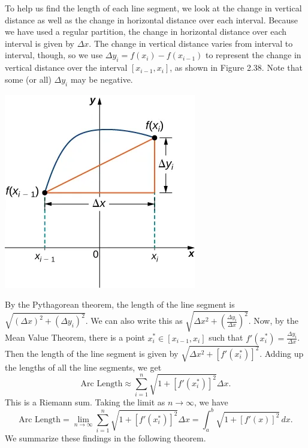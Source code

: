 \documentclass{report}
\begin{document}
    \bigbreak \noindent 
    \begin{minipage}[]{0.47\textwidth}
        To help us find the length of each line segment, we look at the change in vertical distance as well as the change in horizontal distance over each interval. Because we have used a regular partition, the change in horizontal distance over each interval is given by \(\Delta x\). The change in vertical distance varies from interval to interval, though, so we use \(\Delta y_i = f(x_i) - f(x_{i-1})\) to represent the change in vertical distance over the interval \([x_{i-1},x_i]\), as shown in Figure 2.38. Note that some (or all) \(\Delta y_i\) may be negative.
    
    \end{minipage}
    \begin{minipage}[]{0.47\textwidth}
        \begin{center}
            \includegraphics[scale=0.5]{./figures/123.png}
        \end{center}
    
    \end{minipage}

    \pagebreak \bigbreak \noindent 
    By the Pythagorean theorem, the length of the line segment is \(\sqrt{(\Delta x)^2 + (\Delta y_i)^2}\). We can also write this as \(\sqrt{\Delta x^2 + \left(\frac{\Delta y_i}{\Delta x}\right)^2}\).
    \bigbreak \noindent 
    Now, by the Mean Value Theorem, there is a point \(x^*_i \in [x_{i-1},x_i]\) such that \(f'(x^*_i) = \frac{\Delta y_i}{\Delta x}\). Then the length of the line segment is given by \(\sqrt{\Delta x^2 + [f'(x^*_i)]^2}\).
    \bigbreak \noindent 
    Adding up the lengths of all the line segments, we get
    \bigbreak \noindent 
    \[
    \text{Arc Length} \approx \sum_{i=1}^n \sqrt{1 + [f'(x^*_i)]^2}\Delta x.
    \]
    This is a Riemann sum. Taking the limit as \(n \to \infty\), we have
    \[
    \text{Arc Length} = \lim_{n \to \infty} \sum_{i=1}^n \sqrt{1 + [f'(x^*_i)]^2}\Delta x = \int_a^b \sqrt{1 + [f'(x)]^2}\, dx.
    \]
    We summarize these findings in the following theorem.
\end{document}

